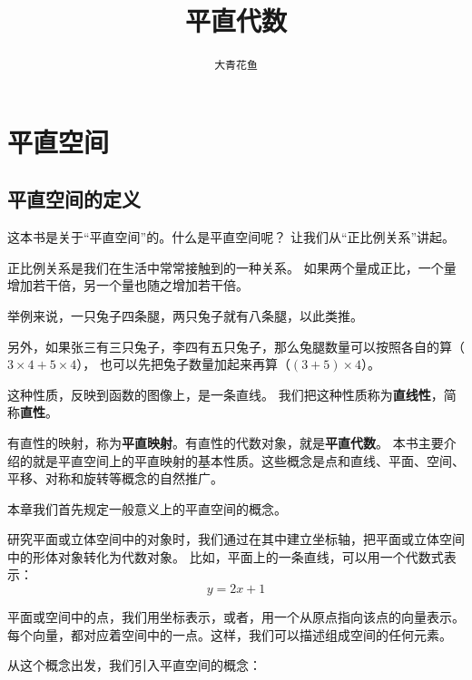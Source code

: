 \documentclass[12pt,UTF8]{ctexbook}
\title{\zihao{0} \bfseries 平直代数}
\author{\zihao{2} \texttt{大青花鱼}}
\date{}
\begin{document}
\maketitle
\tableofcontents
\newpage

\chapter{平直空间}
\section{平直空间的定义}
这本书是关于“平直空间”的。什么是平直空间呢？
让我们从“正比例关系”讲起。

正比例关系是我们在生活中常常接触到的一种关系。
如果两个量成正比，一个量增加若干倍，另一个量也随之增加若干倍。

举例来说，一只兔子四条腿，两只兔子就有八条腿，以此类推。

另外，如果张三有三只兔子，李四有五只兔子，那么兔腿数量可以按照各自的算（$3\times4 +5\times4$），
也可以先把兔子数量加起来再算（$(3+5)\times4$）。

这种性质，反映到函数的图像上，是一条直线。
我们把这种性质称为\textbf{直线性}，简称\textbf{直性}。

有直性的映射，称为\textbf{平直映射}。有直性的代数对象，就是\textbf{平直代数}。
本书主要介绍的就是平直空间上的平直映射的基本性质。这些概念是点和直线、平面、空间、平移、对称和旋转等概念的自然推广。

本章我们首先规定一般意义上的平直空间的概念。

研究平面或立体空间中的对象时，我们通过在其中建立坐标轴，把平面或立体空间中的形体对象转化为代数对象。
比如，平面上的一条直线，可以用一个代数式表示：
$$ y = 2x + 1$$

平面或空间中的点，我们用坐标表示，或者，用一个从原点指向该点的向量表示。
每个向量，都对应着空间中的一点。这样，我们可以描述组成空间的任何元素。

从这个概念出发，我们引入平直空间的概念：
\end{document}

